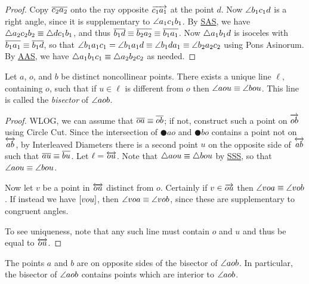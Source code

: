 \begin{proof}
Copy \(\overline{c_2a_2}\) onto the ray opposite \(\overrightarrow{c_1a_1}\) at the point \(d\).
Now \(\angle{b_1c_1d}\) is a right angle, since it is supplementary to \(\angle{a_1c_1b_1}\).
By \hyperref[prop:sas-theorem]{SAS}, we have \(\bigtriangleup{a_2c_2b_2} \equiv \bigtriangleup{dc_1b_1}\), and thus \(\overline{b_1d} \equiv \overline{b_2a_2} \equiv \overline{b_1a_1}\).
Now \(\bigtriangleup{a_1b_1d}\) is isoceles with \(\overline{b_1a_1} \equiv \overline{b_1d}\), so that \(\angle{b_1a_1c_1} = \angle{b_1a_1d} \equiv \angle{b_1da_1} \equiv \angle{b_2a_2c_2}\) using Pons Asinorum.
By \hyperref[prop:aas-theorem]{AAS}, we have \(\bigtriangleup{a_1b_1c_1} \equiv \bigtriangleup{a_2b_2c_2}\) as needed.
\end{proof}


\begin{construct}
Let \(a\), \(o\), and \(b\) be distinct noncollinear points.
There exists a unique line \(\ell\), containing \(o\), such that if \(u \in \ell\) is different from \(o\) then \(\angle{aou} \equiv \angle{bou}\).
This line is called the \emph{bisector} of \(\angle{aob}\).
\end{construct}

\begin{proof}
WLOG, we can assume that \(\overline{oa} \equiv \overline{ob}\); if not, construct such a point on \(\overrightarrow{ob}\) using Circle Cut.
Since the intersection of \(\CIRCLE{a}{o}\) and \(\CIRCLE{b}{o}\) contains a point not on \(\overleftrightarrow{ab}\), by Interleaved Diameters there is a second point \(u\) on the opposite side of \(\overleftrightarrow{ab}\) such that \(\overline{au} \equiv \overline{bu}\).
Let \(\ell = \overleftrightarrow{ou}\).
Note that \(\bigtriangleup{aou} \equiv \bigtriangleup{bou}\) by \hyperref[prop:sss-theorem]{SSS}, so that \(\angle{aou} \equiv \angle{bou}\).

Now let \(v\) be a point in \(\overleftrightarrow{ou}\) distinct from \(o\).
Certainly if \(v \in \overrightarrow{ou}\) then \(\angle{voa} \equiv \angle{vob}\).
If instead we have \([ v o u ]\), then \(\angle{voa} \equiv \angle{vob}\), since these are supplementary to congruent angles.

To see uniqueness, note that any such line must contain \(o\) and \(u\) and thus be equal to \(\overleftrightarrow{ou}\).
\end{proof}

\begin{cor}
The points \(a\) and \(b\) are on opposite sides of the bisector of \(\angle{aob}\).
In particular, the bisector of \(\angle{aob}\) contains points which are interior to \(\angle{aob}\).
\end{cor}

